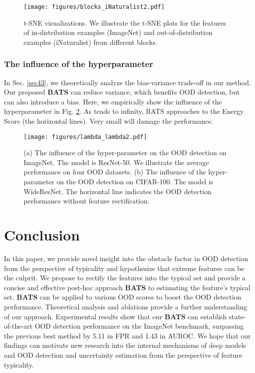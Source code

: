 \documentclass{article}
\begin{document}
\begin{figure}[htbp]
\centering
\texttt{[image: figures/blocks\_iNaturalist2.pdf]}
\vspace{-0.4cm}
\caption{t-SNE visualizations. We illustrate the t-SNE plots for the features of in-distribution examples (ImageNet) and out-of-distribution examples (iNaturalist) from different blocks.}
\label{img:blocks_inaturalist}
\end{figure}

\subsubsection{The influence of the hyperparameter}\label{sec:influence}

In Sec. \ref{sec43}, we theoretically analyze the bias-variance trade-off in our method. 
{Our proposed \textbf{BATS} can reduce variance, which benefits OOD detection, but can also introduce a bias.}
Here, we empirically show the influence of the hyperparameter  in Fig. \ref{img:lambda_lambda}. As  tends to infinity, BATS approaches to the Energy Score (the horizontal lines). Very small  will damage the performance. 

\begin{figure}[htbp]
\centering
\texttt{[image: figures/lambda\_lambda2.pdf]}
\vspace{-0.3cm}
\caption{(a) The influence of the hyper-parameter  on the OOD detection on ImageNet. The model is ResNet-50. We illustrate the average performance on four OOD datasets. (b) The influence of the hyper-parameter  on the OOD detection on CIFAR-100. The model is WideResNet. The horizontal line indicates the OOD detection performance without feature rectification.}
\vspace{-0.3cm}
\label{img:lambda_lambda}
\end{figure}





\section{Conclusion}\label{Conclusion}

In this paper, we provide novel insight into the obstacle factor in OOD detection from the perspective of typicality and hypothesize that extreme features can be the culprit.
We propose to rectify the features into the typical set and provide a concise and effective post-hoc approach \textbf{BATS} to estimating the feature's typical set. \textbf{BATS} can be applied to various OOD scores to boost the OOD detection performance. Theoretical analysis and ablations provide a further understanding of our approach.
Experimental results show that our \textbf{BATS} can establish state-of-the-art OOD detection performance on the ImageNet benchmark, surpassing the previous best method by 5.11 in FPR and 1.43 in AUROC.
We hope that our findings can motivate new research into the internal mechanisms of deep models and OOD detection and uncertainty estimation from the perspective of feature typicality.
\end{document}
